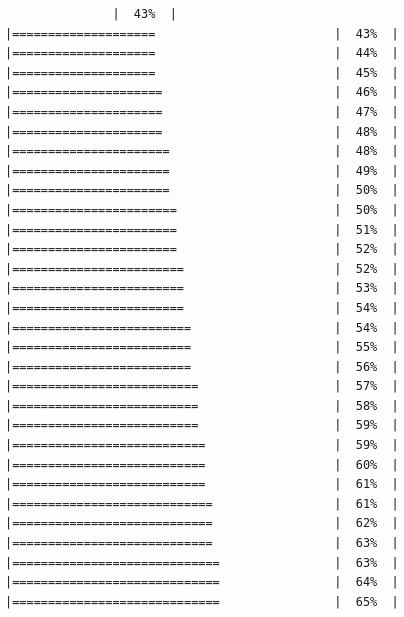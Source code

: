 \documentclass[
  krantz2]{krantz}
\begin{document}
\begin{verbatim}
               |  43%  |                                                     |====================                         |  43%  |                                                     |====================                         |  44%  |                                                     |====================                         |  45%  |                                                     |=====================                        |  46%  |                                                     |=====================                        |  47%  |                                                     |=====================                        |  48%  |                                                     |======================                       |  48%  |                                                     |======================                       |  49%  |                                                     |======================                       |  50%  |                                                     |=======================                      |  50%  |                                                     |=======================                      |  51%  |                                                     |=======================                      |  52%  |                                                     |========================                     |  52%  |                                                     |========================                     |  53%  |                                                     |========================                     |  54%  |                                                     |=========================                    |  54%  |                                                     |=========================                    |  55%  |                                                     |=========================                    |  56%  |                                                     |==========================                   |  57%  |                                                     |==========================                   |  58%  |                                                     |==========================                   |  59%  |                                                     |===========================                  |  59%  |                                                     |===========================                  |  60%  |                                                     |===========================                  |  61%  |                                                     |============================                 |  61%  |                                                     |============================                 |  62%  |                                                     |============================                 |  63%  |                                                     |=============================                |  63%  |                                                     |=============================                |  64%  |                                                     |=============================                |  65%  |                                                     
\end{verbatim}
\end{document}
